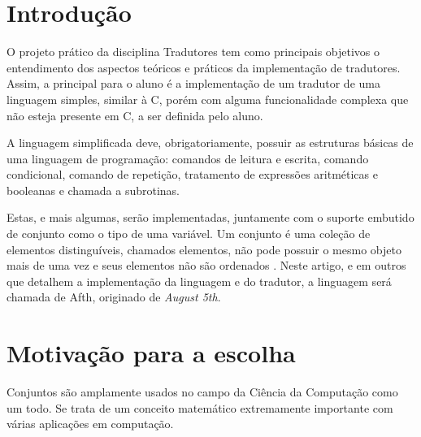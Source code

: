 \documentclass[
	article,			%
	11pt,				%
	oneside,			%
	a4paper,			%
	english,			%
	brazil,				%
	sumario=tradicional
	]{abntex2}
\begin{document}

\begin{center}\smaller
	
	
\end{center}

\textual

\section{Introdução}

O projeto prático da disciplina Tradutores tem como principais objetivos o entendimento
dos aspectos teóricos e práticos da implementação de tradutores. Assim, a principal
para o aluno é a implementação de um tradutor de uma linguagem simples, similar à C,
porém com alguma funcionalidade complexa que não esteja presente em C,
a ser definida pelo aluno.

A linguagem simplificada deve, obrigatoriamente, possuir as estruturas básicas de uma
linguagem de programação: comandos de leitura e escrita, comando condicional,
comando de repetição, tratamento de expressões aritméticas e booleanas e chamada a
subrotinas.

Estas, e mais algumas, serão implementadas, juntamente com o suporte embutido de conjunto
como o tipo de uma variável. Um conjunto é uma coleção de elementos distinguíveis, chamados
elementos, não pode possuir o mesmo objeto mais de uma vez e seus elementos não são ordenados
\cite[Apêndice B.1]{Cormen:2009:IAT:1614191}. Neste artigo, e em outros que detalhem a implementação da linguagem e do tradutor, a linguagem
será chamada de Afth, originado de \textit{August 5th}.

\section{Motivação para a escolha}

Conjuntos são amplamente usados no campo da Ciência da Computação
como um todo. Se trata de um conceito matemático extremamente importante
com várias aplicações em computação.
\end{document}
